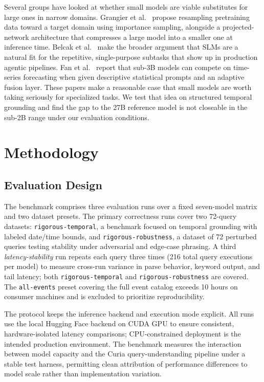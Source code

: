 \documentclass[conference]{IEEEtran}
\begin{document}
Several groups have looked at whether small models are viable substitutes for large ones in narrow domains. Grangier et al.~\cite{grangier2024small} propose resampling pretraining data toward a target domain using importance sampling, alongside a projected-network architecture that compresses a large model into a smaller one at inference time. Belcak et al.~\cite{belcak2025slm} make the broader argument that SLMs are a natural fit for the repetitive, single-purpose subtasks that show up in production agentic pipelines. Fan et al.~\cite{fan2025smallmighty} report that sub-3B models can compete on time-series forecasting when given descriptive statistical prompts and an adaptive fusion layer. These papers make a reasonable case that small models are worth taking seriously for specialized tasks. We test that idea on structured temporal grounding and find the gap to the 27B reference model is not closeable in the sub-2B range under our evaluation conditions.

\section{Methodology}
\label{sec:method}

\subsection{Evaluation Design}

The benchmark comprises three evaluation runs over a fixed seven-model matrix and two dataset presets. The primary correctness runs cover two 72-query datasets: \texttt{rigorous-temporal}, a benchmark focused on temporal grounding with labeled date/time bounds, and \texttt{rigorous-robustness}, a dataset of 72 perturbed queries testing stability under adversarial and edge-case phrasing. A third \emph{latency-stability} run repeats each query three times (216 total query executions per model) to measure cross-run variance in parse behavior, keyword output, and tail latency; both \texttt{rigorous-temporal} and \texttt{rigorous-robustness} are covered. The \texttt{all-events} preset covering the full event catalog exceeds 10 hours on consumer machines and is excluded to prioritize reproducibility.

The protocol keeps the inference backend and execution mode explicit. All runs use the local Hugging Face backend on CUDA GPU to ensure consistent, hardware-isolated latency comparisons; CPU-constrained deployment is the intended production environment. The benchmark measures the interaction between model capacity and the Curia query-understanding pipeline under a stable test harness, permitting clean attribution of performance differences to model scale rather than implementation variation.
\end{document}
